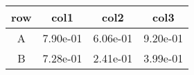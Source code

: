 \begin{tabular}{cccc}
\toprule
row&col1&col2&col3\tabularnewline
\midrule
A&7.90e-01&6.06e-01&9.20e-01\tabularnewline
B&7.28e-01&2.41e-01&3.99e-01\tabularnewline
\bottomrule
\end{tabular}
